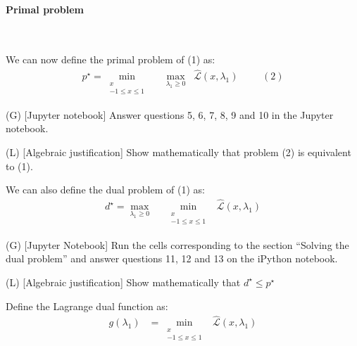 \paragraph{Primal problem}\

We can now define the primal problem of (1) as:
\begin{align*}
    p^\star = \min_{\substack{x \\ -1 \leq x \leq 1}} &\;\; \max_{\lambda_1\geq 0}\;\; \hat{\mathcal{L}}(x,\lambda_1) &&& (2)
\end{align*}

\begin{enumerate}
    \setcounter{enumi}{3}
    \qitem (G) [Jupyter notebook] Answer questions 5, 6, 7, 8, 9 and 10 in the Jupyter notebook.
    
    \sol{}
    \qitem (L) [Algebraic justification] Show mathematically that problem (2) is equivalent to (1).
    
    \sol{}
\end{enumerate}


We can also define the dual problem of (1) as:
\begin{align*}
    d^\star = \max_{\lambda_1\geq 0} &\;\; \min_{\substack{x \\ -1 \leq x \leq 1}} \;\; \hat{\mathcal{L}}(x,\lambda_1)
\end{align*}

\begin{enumerate}
    \setcounter{enumi}{5}
    \qitem (G) [Jupyter Notebook] Run the cells corresponding to the section ``Solving the dual problem'' and answer questions 11, 12 and 13 on the iPython notebook.
    
    \sol{}
    
    \qitem (L) [Algebraic justification] Show mathematically that $d^\star \leq p^\star$
    
    \sol{}
\end{enumerate}

Define the Lagrange dual function as:
\begin{align*}
    g(\lambda_1) &= \min_{\substack{x \\ -1 \leq x \leq 1}} \;\; \hat{\mathcal{L}}(x,\lambda_1)
\end{align*}

